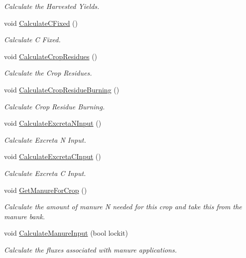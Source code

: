 \begin{DoxyCompactItemize}
\begin{DoxyCompactList}\small\item\em Calculate the Harvested Yields. \end{DoxyCompactList}\item 
void \mbox{\hyperlink{class_crop_class_a6621718e2097460667080dc68dc00b4d}{Calculate\+C\+Fixed}} ()
\begin{DoxyCompactList}\small\item\em Calculate C Fixed. \end{DoxyCompactList}\item 
void \mbox{\hyperlink{class_crop_class_a37721141ba2db316dc8a5f0c4f91d2bf}{Calculate\+Crop\+Residues}} ()
\begin{DoxyCompactList}\small\item\em Calculate the Crop Residues. \end{DoxyCompactList}\item 
void \mbox{\hyperlink{class_crop_class_ad07cc1a644d7c6987571094a60c4af94}{Calculate\+Crop\+Residue\+Burning}} ()
\begin{DoxyCompactList}\small\item\em Calculate Crop Residue Burning. \end{DoxyCompactList}\item 
void \mbox{\hyperlink{class_crop_class_acd893cea7f299839620d4e0556b36cc8}{Calculate\+Excreta\+N\+Input}} ()
\begin{DoxyCompactList}\small\item\em Calculate Excreta N Input. \end{DoxyCompactList}\item 
void \mbox{\hyperlink{class_crop_class_aa846428c46858858c7eda67db3cbbb0b}{Calculate\+Excreta\+C\+Input}} ()
\begin{DoxyCompactList}\small\item\em Calculate Excreta C Input. \end{DoxyCompactList}\item 
void \mbox{\hyperlink{class_crop_class_ad7e6adfa5dfd99f0f748eedab3b3e336}{Get\+Manure\+For\+Crop}} ()
\begin{DoxyCompactList}\small\item\em Calculate the amount of manure N needed for this crop and take this from the manure bank. \end{DoxyCompactList}\item 
void \mbox{\hyperlink{class_crop_class_a42e1e825d1c1377dee711b761f1453fc}{Calculate\+Manure\+Input}} (bool lockit)
\begin{DoxyCompactList}\small\item\em Calculate the fluxes associated with manure applications. \end{DoxyCompactList}\item 

\end{DoxyCompactItemize}
